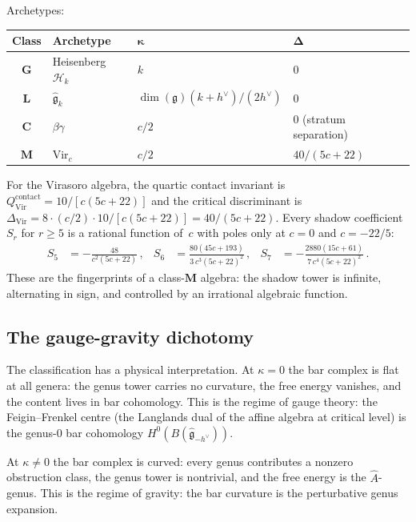 \documentclass[11pt,reqno]{amsart}
\theoremstyle{definition}
\theoremstyle{remark}
\providecommand{\cH}{\mathcal{H}}
\providecommand{\fg}{\mathfrak{g}}
\providecommand{\Vir}{\mathrm{Vir}}
\numberwithin{equation}{section}
\begin{document}
Archetypes:
\begin{center}
\renewcommand{\arraystretch}{1.3}
\begin{tabular}{clll}
\toprule
\textbf{Class} & \textbf{Archetype}
 & $\boldsymbol{\kappa}$ & $\boldsymbol{\Delta}$ \\
\midrule
$\mathbf{G}$ & Heisenberg $\cH_k$
 & $k$ & $0$ \\
$\mathbf{L}$ & $\widehat{\fg}_k$
 & $\dim(\fg)(k{+}h^\vee)/(2h^\vee)$ & $0$ \\
$\mathbf{C}$ & $\beta\gamma$
 & $c/2$ & $0$ (stratum separation) \\
$\mathbf{M}$ & $\Vir_c$
 & $c/2$ & $40/(5c{+}22)$ \\
\bottomrule
\end{tabular}
\end{center}

For the Virasoro algebra, the quartic contact invariant is
$Q^{\mathrm{contact}}_{\Vir} = 10/[c(5c+22)]$ and the
critical discriminant is $\Delta_{\Vir} = 8 \cdot (c/2)
\cdot 10/[c(5c+22)] = 40/(5c+22)$. Every shadow
coefficient $S_r$ for $r \ge 5$ is a rational function
of~$c$ with poles only at $c = 0$ and $c = -22/5$:
\begin{align}
S_5 &= -\frac{48}{c^2(5c{+}22)}\,,
 &
S_6 &= \frac{80(45c{+}193)}{3\,c^3(5c{+}22)^2}\,,
 &
S_7 &= -\frac{2880(15c{+}61)}{7\,c^4(5c{+}22)^2}\,.
\label{eq:shadow-coefficients}
\end{align}
These are the fingerprints of a class-$\mathbf{M}$ algebra:
the shadow tower is infinite, alternating in sign, and
controlled by an irrational algebraic function.

\subsection{The gauge-gravity dichotomy}
\label{ssec:gauge-gravity}

The classification has a physical interpretation. At
$\kappa = 0$ the bar complex is flat at all genera:
the genus tower carries no curvature, the free energy
vanishes, and the content lives in bar cohomology. This
is the regime of gauge theory: the Feigin--Frenkel centre
(the Langlands dual of the affine algebra at critical level)
is the genus-$0$ bar cohomology $H^0(B(\widehat{\fg}_{-h^\vee}))$.

At $\kappa \ne 0$ the bar complex is curved: every genus
contributes a nonzero obstruction class, the genus tower
is nontrivial, and the free energy is the $\hat{A}$-genus.
This is the regime of gravity: the bar curvature is the
perturbative genus expansion.
\end{document}
